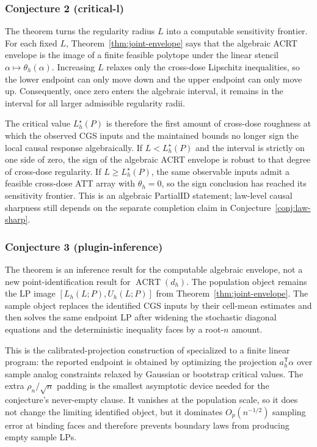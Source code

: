 \documentclass[11pt]{article}
\newcommand{\transpose}{\mathsf{T}}
\theoremstyle{definition}
\theoremstyle{plain}
\theoremstyle{remark}
\begin{document}
\subsubsection*{Conjecture 2 (critical-l)}
The theorem turns the regularity radius \(L\) into a computable sensitivity
frontier.  For each fixed \(L\), Theorem~\ref{thm:joint-envelope} says that
the algebraic ACRT envelope is the image of a finite feasible polytope under
the linear stencil \(\alpha\mapsto\theta_h(\alpha)\).  Increasing \(L\) relaxes
only the cross-dose Lipschitz inequalities, so the lower endpoint can only move
down and the upper endpoint can only move up.  Consequently, once zero enters
the algebraic interval, it remains in the interval for all larger admissible
regularity radii.

The critical value \(L_h^\star(P)\) is therefore the first amount of
cross-dose roughness at which the observed CGS inputs and the maintained
bounds no longer sign the local causal response algebraically.  If
\(L<L_h^\star(P)\) and the interval is strictly on one side of zero, the sign
of the algebraic ACRT envelope is robust to that degree of cross-dose
regularity.  If \(L\ge L_h^\star(P)\), the same observable inputs admit a
feasible cross-dose ATT array with \(\theta_h=0\), so the sign conclusion has
reached its sensitivity frontier.  This is an algebraic PartialID statement;
law-level causal sharpness still depends on the separate completion claim in
Conjecture~\ref{conj:law-sharp}.

\subsubsection*{Conjecture 3 (plugin-inference)}
The theorem is an inference result for the computable algebraic envelope, not
a new point-identification result for \(\operatorname{ACRT}(d_h)\).  The
population object remains the LP image
\([L_h(L;P),U_h(L;P)]\) from Theorem~\ref{thm:joint-envelope}.  The sample
object replaces the identified CGS inputs by their cell-mean estimates and
then solves the same endpoint LP after widening the stochastic diagonal
equations and the deterministic inequality faces by a root-\(n\) amount.

This is the calibrated-projection construction of
\cite{KaidoMolinariStoye2019} specialized to a finite linear program: the
reported endpoint is obtained by optimizing the projection
\(a_h^\transpose\alpha\) over sample analog constraints relaxed by Gaussian or
bootstrap critical values.  The extra \(\rho_n/\sqrt n\) padding is the
smallest asymptotic device needed for the conjecture's never-empty clause.
It vanishes at the population scale, so it does not change the limiting
identified object, but it dominates \(O_p(n^{-1/2})\) sampling error at
binding faces and therefore prevents boundary laws from producing empty
sample LPs.
\end{document}
